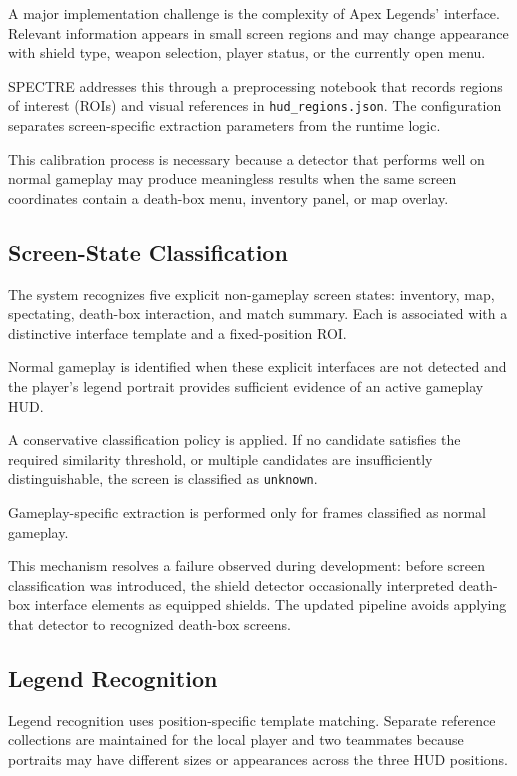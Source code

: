 \documentclass[10pt,letterpaper]{article}
\begin{document}
A major implementation challenge is the complexity of Apex
Legends' interface. Relevant information appears in small
screen regions and may change appearance with shield type,
weapon selection, player status, or the currently open menu.

SPECTRE addresses this through a preprocessing notebook that
records regions of interest (ROIs) and visual references in
\texttt{hud\_regions.json}. The configuration separates
screen-specific extraction parameters from the runtime logic.

This calibration process is necessary because a detector that
performs well on normal gameplay may produce meaningless
results when the same screen coordinates contain a death-box
menu, inventory panel, or map overlay.

\subsection{Screen-State Classification}

The system recognizes five explicit non-gameplay screen states:
inventory, map, spectating, death-box interaction, and match
summary. Each is associated with a distinctive interface
template and a fixed-position ROI.

Normal gameplay is identified when these explicit interfaces
are not detected and the player's legend portrait provides
sufficient evidence of an active gameplay HUD.

A conservative classification policy is applied. If no
candidate satisfies the required similarity threshold, or
multiple candidates are insufficiently distinguishable,
the screen is classified as \texttt{unknown}.

Gameplay-specific extraction is performed only for frames
classified as normal gameplay.

This mechanism resolves a failure observed during development:
before screen classification was introduced, the shield detector
occasionally interpreted death-box interface elements as
equipped shields. The updated pipeline avoids applying that
detector to recognized death-box screens.

\subsection{Legend Recognition}

Legend recognition uses position-specific template matching.
Separate reference collections are maintained for the local
player and two teammates because portraits may have different
sizes or appearances across the three HUD positions.
\end{document}
